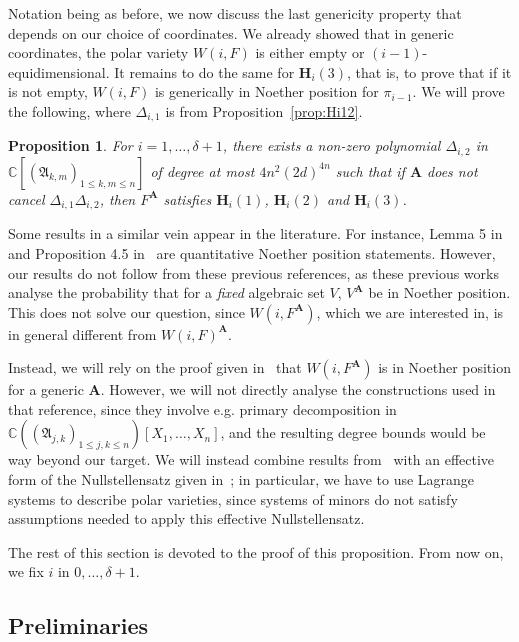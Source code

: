 \documentclass[12pt]{article}
\def\A{\mathfrak{A}}
\def\mA{{\bm A}}
\def\D{\Delta}
\def\C{\mathbb{C}}
\newtheorem{prop}[theorem]{Proposition}
\begin{document}
Notation being as before, we now discuss the last genericity property
that depends on our choice of coordinates. We already showed that in
generic coordinates, the polar variety $W(i, F)$ is either empty or
$(i-1)$-equidimensional. It remains to do the same for $\bm H_i(3)$, 
that is, to prove that if it is not empty, $W(i, F)$ is generically in Noether
position for $\pi_{i-1}$. We will prove the following, where $\D_{i,1}$ is
from Proposition~\ref{prop:Hi12}.
\begin{prop}\label{prop:Hi123}
  For $i=1,\dots,\delta+1$, there exists a non-zero polynomial 
  $\D_{i,2}$ in $\C[(\A_{k,m})_{1 \le k,m \le n}]$ of degree at most
  $4n^2(2d)^{4n}$ such that if $\mA$ does not cancel $\D_{i,1}
  \D_{i,2}$, then $F^{\mA}$ satisfies $\bm H_i(1)$, $\bm H_i(2)$ and
  $\bm H_i(3)$.
\end{prop}
Some results in a similar vein appear in the literature. For instance,
Lemma 5 in~\cite{JeSa10} and Proposition 4.5
in~\cite{SharpEstimatesForTheEffectiveN} are quantitative Noether
position statements. However, our results do not follow from these
previous references, as these previous works analyse the probability
that for a {\em fixed} algebraic set $V$, $V^\mA$ be in Noether
position.  This does not solve our question, since
$W(i,F^\mA)$, which we are interested in, is in general
different from $W(i,F)^\mA$.

Instead, we will rely on the proof given in~\cite{EMP} that
$W(i,F^\mA)$ is in Noether position for a generic $\mA$.  However,
we will not directly analyse the constructions used in that reference,
since they involve e.g. primary decomposition in $\C((\A_{j,k})_{1 \le
  j,k \le n})[X_1,\dots,X_n]$, and the resulting degree bounds would
be way beyond our target. We will instead combine results
from~\cite{EMP} with an effective form of the Nullstellensatz given
in~\cite{EN}; in particular, we have to use Lagrange systems to
describe polar varieties, since systems of minors do not satisfy
assumptions needed to apply this effective Nullstellensatz.
 
The rest of this section is devoted to the proof of this proposition.
From now on, we fix $i$ in $0,\dots,\delta+1$.


\subsection{Preliminaries}
\end{document}

